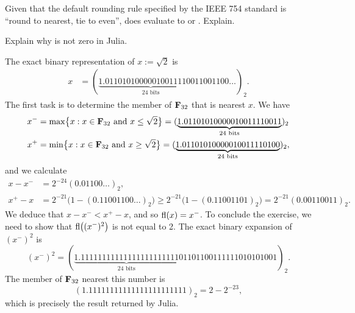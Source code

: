 \begin{exercise}
    Given that the default rounding rule specified by the IEEE 754 standard is ``round to nearest, tie to even'',
    does  evaluate to  or .
    Explain.
\end{exercise}

\begin{exercise}
    Explain why  is not zero in Julia.
\end{exercise}
\begin{solution}
    The exact binary representation of $x := \sqrt{2}$ is
    \begin{align*}
        x
        &= (\underbrace{1.01101010000010011110011}_{\text{24 bits}}001100\dots)_2.
    \end{align*}
    The first task is to determine the member of $\mathbf F_{32}$ that is nearest $x$.
    We have
    \begin{align*}
        x^- &= \max \bigl\{x: x \in \mathbf F_{32} \text{ and } x \leq \sqrt{2}\bigr\} = (\underbrace{1.01101010000010011110011}_{\text{24 bits}})_2 \\
        x^+ &= \min \bigl\{x: x \in \mathbf F_{32} \text{ and } x \geq \sqrt{2}\bigr\} = (\underbrace{1.01101010000010011110100}_{\text{24 bits}})_2,
    \end{align*}
    and we calculate
    \begin{align*}
        x - x^- &= 2^{-24} (0.01100\dots)_2, \\
        x^+ - x &= 2^{-21} \bigl(1 - (0.11001100\dots)_2 \bigr)
        \geq 2^{-21} \bigl(1 - (0.11001101)_2 \bigr) =
        2^{-21} \left(0.00110011\right)_2.
    \end{align*}
    We deduce that $x - x^- < x^+ - x$,
    and so ${\rm fl}(x) = x^-$.
    To conclude the exercise,
    we need to show that ${\rm fl}\bigl((x^-)^2\bigr)$ is not equal to 2.
    The exact binary expansion of $(x^-)^2$ is
    \[
        (x^-)^2 = (\underbrace{1.11111111111111111111111}_{\text{24 bits}}01101100111111010101001)_2.
    \]
    The member of $\mathbf F_{32}$ nearest this number is
    \[
        (1.11111111111111111111111)_2 = 2 - 2^{-23},
    \]
    which is precisely the result returned by Julia.
\end{solution}

